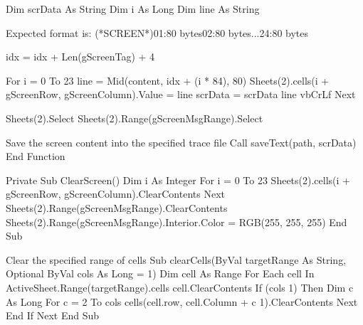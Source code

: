\documentclass[letterpaper,10pt,english]{sphinxmanual}
\begin{document}
\begin{sphinxVerbatim}[commandchars=\\\{\}]
      Dim scrData As String
      Dim i As Long
      Dim line As String

      \PYGZsq{} Expected format is:
      \PYGZsq{} (*SCREEN*)\PYGZsh{}01:\PYGZlt{}80 bytes\PYGZgt{}\PYGZsh{}02:\PYGZlt{}80 bytes\PYGZgt{}...\PYGZsh{}24:\PYGZlt{}80 bytes\PYGZgt{}

      idx = idx + Len(g\PYGZus{}ScreenTag) + 4

      For i = 0 To 23
            line = Mid(content, idx + (i * 84), 80)
            Sheets(2).cells(i + g\PYGZus{}ScreenRow, g\PYGZus{}ScreenColumn).Value = line
            scrData = scrData \PYGZam{} line \PYGZam{} vbCrLf
      Next

      Sheets(2).Select
      Sheets(2).Range(g\PYGZus{}ScreenMsgRange).Select

      \PYGZsq{} Save the screen content into the specified trace file
      Call saveText(path, scrData)
End Function

Private Sub ClearScreen()
      Dim i As Integer
      For i = 0 To 23
            Sheets(2).cells(i + g\PYGZus{}ScreenRow, g\PYGZus{}ScreenColumn).ClearContents
      Next
      Sheets(2).Range(g\PYGZus{}ScreenMsgRange).ClearContents
      Sheets(2).Range(g\PYGZus{}ScreenMsgRange).Interior.Color = RGB(255, 255, 255)
End Sub

\PYGZsq{} Clear the specified range of cells
\PYGZsq{}
Sub clearCells(ByVal targetRange As String, Optional ByVal cols As Long = 1)
      Dim cell As Range
      For Each cell In ActiveSheet.Range(targetRange).cells
            cell.ClearContents
            If (cols \PYGZgt{} 1) Then
                  Dim c As Long
                  For c = 2 To cols
                        cells(cell.row, cell.Column + c \PYGZhy{} 1).ClearContents
                  Next
            End If
      Next
End Sub
\end{sphinxVerbatim}



\renewcommand{\indexname}{Index}
\printindex
\end{document}
